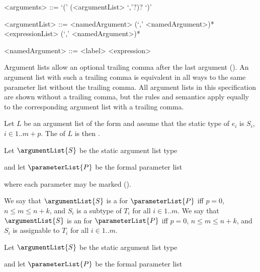 \documentclass[makeidx]{article}
\begin{document}
{\begin{grammar}
<arguments> ::= `(' (<argumentList> `,'?)? `)'

<argumentList> ::= <namedArgument> (`,' <namedArgument>)*
  \alt <expressionList> (`,' <namedArgument>)*

<namedArgument> ::= <label> <expression>
\end{grammar}

\LMHash{}%
Argument lists allow an optional trailing comma after the last argument
().
An argument list with such a trailing comma is equivalent in all ways to
the same parameter list without the trailing comma.
All argument lists in this specification are shown without a trailing comma,
but the rules and semantics apply equally to
the corresponding argument list with a trailing comma.

\LMHash{}%
Let $L$ be an argument list of the form
and assume that the static type of $e_i$ is $S_i$, $i \in 1 .. m+p$.
The  of $L$ is then
.

\LMHash{}%
Let $\argumentList{S}$ be the static argument list type


\noindent
and let $\parameterList{P}$ be the formal parameter list


\noindent
where each parameter may be marked \COVARIANT{}
().

\LMHash{}%
We say that $\argumentList{S}$ is
a  for $\parameterList{P}$
if{}f $p = 0$, $n \leq m \leq n+k$, and $S_i$ is
a subtype of $T_i$ for all $i \in 1 .. m$.
We say that $\argumentList{S}$ is
an  for $\parameterList{P}$
if{}f $p = 0$, $n \leq m \leq n+k$, and $S_i$ is
assignable to $T_i$ for all $i \in 1 .. m$.

\LMHash{}%
Let $\argumentList{S}$ be the static argument list type


\noindent
and let $\parameterList{P}$ be the formal parameter list


}
\end{document}
